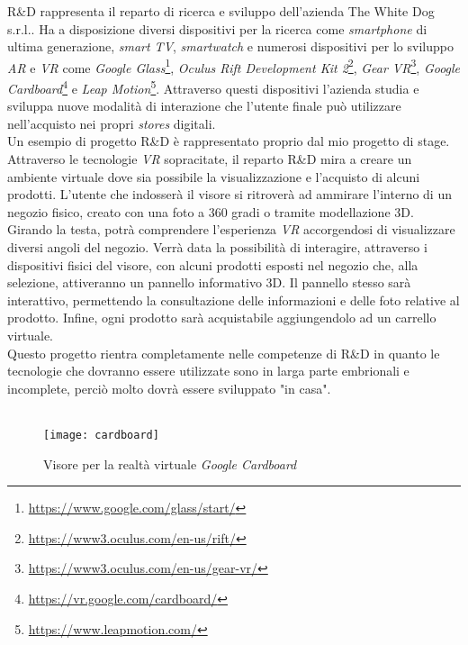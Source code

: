 R\&D rappresenta il reparto di ricerca e sviluppo dell'azienda The White Dog s.r.l..
Ha a disposizione diversi dispositivi per la ricerca come \textit{smartphone} di ultima generazione, \textit{smart TV}, \textit{smartwatch} e numerosi dispositivi per lo sviluppo \textit{AR} e \textit{VR} come \textit{Google Glass}\footnote[11]{\url{https://www.google.com/glass/start/}}, \textit{Oculus Rift Development Kit 2}\footnote[12]{\url{https://www3.oculus.com/en-us/rift/}}, \textit{Gear VR}\footnote[13]{\url{https://www3.oculus.com/en-us/gear-vr/}}, \textit{Google Cardboard}\footnote[14]{\url{https://vr.google.com/cardboard/}} e \textit{Leap Motion}\footnote[15]{\url{https://www.leapmotion.com/}}. Attraverso questi dispositivi l'azienda studia e sviluppa nuove modalità di interazione che l'utente finale può utilizzare nell'acquisto nei propri \textit{stores} digitali. \\
Un esempio di progetto R\&D è rappresentato proprio dal mio progetto di stage. Attraverso le tecnologie \textit{VR} sopracitate, il reparto R\&D mira a creare un ambiente virtuale dove sia possibile la visualizzazione e l'acquisto di alcuni prodotti. L'utente che indosserà il visore si ritroverà ad ammirare l'interno di un negozio fisico, creato con una foto a 360 gradi o tramite modellazione 3D. Girando la testa, potrà comprendere l'esperienza \textit{VR} accorgendosi di visualizzare diversi angoli del negozio. Verrà data la possibilità di interagire, attraverso i dispositivi fisici del visore, con alcuni prodotti esposti nel negozio che, alla selezione, attiveranno un pannello informativo 3D. Il pannello stesso sarà interattivo, permettendo la consultazione delle informazioni e delle foto relative al prodotto. Infine, ogni prodotto sarà acquistabile aggiungendolo ad un carrello virtuale. \\
Questo progetto rientra completamente nelle competenze di R\&D in quanto le tecnologie che dovranno essere utilizzate sono in larga parte embrionali e incomplete, perciò molto dovrà essere sviluppato "in casa".
\\ \\
\label{Google Cardboard}
\begin{figure}[ht]
	\begin{center}
		\texttt{[image: cardboard]}
		\hypertarget{gc}{\caption{Visore per la realtà virtuale \textit{Google Cardboard}}}
	\end{center}
\end{figure}
\FloatBarrier